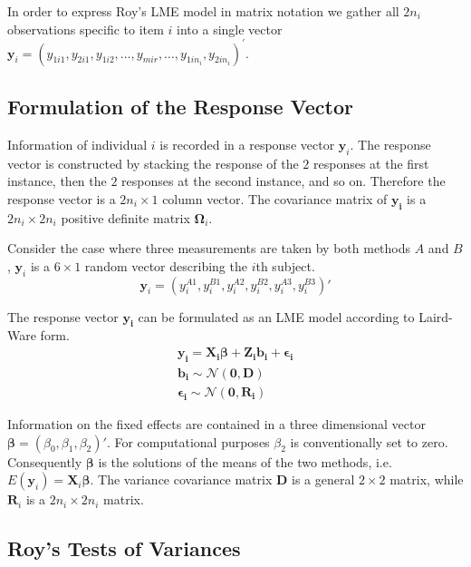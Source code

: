 \documentclass[12pt, a4paper]{report}
\theoremstyle{plain}
\theoremstyle{definition}
\theoremstyle{remark}
\begin{document}
	In order to express Roy's LME model in matrix notation we gather all $2n_i$ observations specific to item $i$ into a single vector  $\boldsymbol{y}_{i} = (y_{1i1},y_{2i1},y_{1i2},\ldots,y_{mir},\ldots,y_{1in_{i}},y_{2in_{i}})^\prime.$ 
	
		\subsection{Formulation of the Response Vector}
		Information of individual $i$ is recorded in a response vector $\boldsymbol{y}_{i}$. The response vector is constructed by stacking the response of the $2$ responses at the first instance, then the $2$ responses at the second instance, and so on. Therefore the response vector is a $2n_{i} \times 1$ column vector.
		The covariance matrix of $\boldsymbol{y_{i}}$ is a $2n_{i} \times 2n_{i}$ positive definite matrix $\boldsymbol{\Omega}_{i}$.
		
		Consider the case where three measurements are taken by both methods $A$ and $B$, $\boldsymbol{y}_{i}$ is a $6 \times 1$ random vector describing the $i$th subject.
		\[
		\boldsymbol{y}_{i} = (y_{i}^{A1},y_{i}^{B1},y_{i}^{A2},y_{i}^{B2},y_{i}^{A3},y_{i}^{B3}) \prime
		\]
		
		The response vector $\boldsymbol{y_{i}}$ can be formulated as an LME model according to Laird-Ware form.
		\begin{eqnarray*}
			\boldsymbol{y_{i}} = \boldsymbol{X_{i}\beta}  + \boldsymbol{Z_{i}b_{i}} + \boldsymbol{\epsilon_{i}}\\
			\boldsymbol{b_{i}} \sim \mathcal{N}(\boldsymbol{0,D})\\
			\boldsymbol{\epsilon_{i}} \sim \mathcal{N}(\boldsymbol{0,R_{i}})
		\end{eqnarray*}
		
		Information on the fixed effects are contained in a three dimensional vector $\boldsymbol{\beta} = (\beta_{0},\beta_{1},\beta_{2})\prime$. For computational purposes $\beta_{2}$ is conventionally set to zero. Consequently $\boldsymbol{\beta}$ is the solutions of the means of the two methods, i.e. $E(\boldsymbol{y}_{i})  = \boldsymbol{X}_{i}\boldsymbol{\beta}$. The variance covariance matrix $\boldsymbol{D}$ is a general $2 \times 2$ matrix, while $\boldsymbol{R}_{i}$ is a $2n_{i} \times 2n_{i}$ matrix.
		

\subsection{Roy's Tests of Variances}
	
\end{document}

